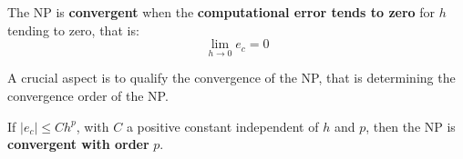 \begin{definitionbox}
    The NP is \textbf{convergent} when the \textbf{computational error tends to zero} for $h$ tending to zero, that is:
    \begin{equation}
        \lim\limits_{h \rightarrow 0} e_{c} = 0
    \end{equation}
\end{definitionbox}

\noindent
A crucial aspect is to qualify the convergence of the NP, that is determining the convergence order of the NP.

\begin{definitionbox}
    If $\left|e_{c}\right| \le Ch^{p}$, with $C$ a positive constant independent of $h$ and $p$, then the NP is \textbf{convergent with order} $p$.
\end{definitionbox}


